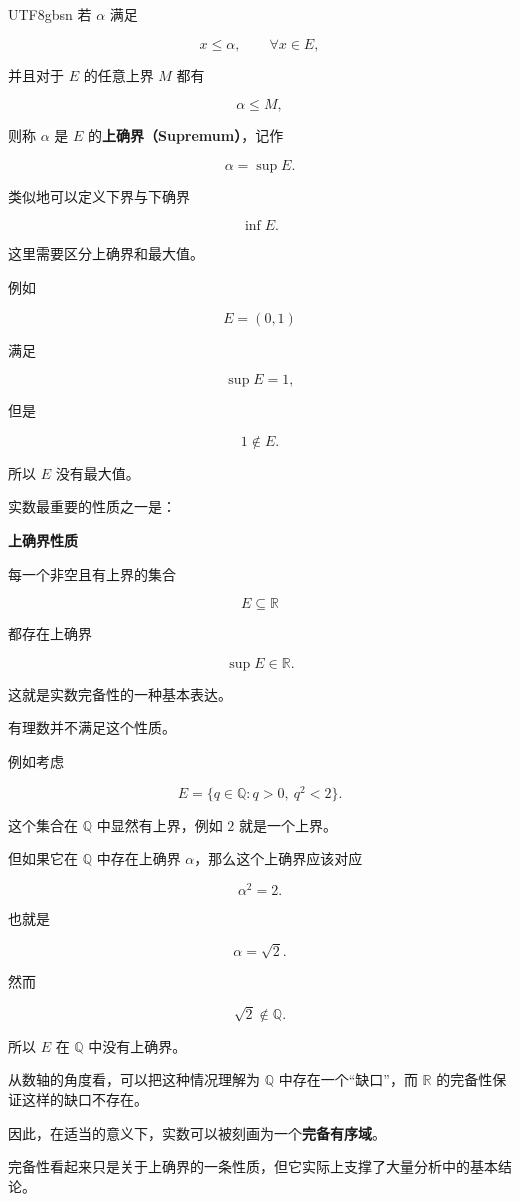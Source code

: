 \documentclass[11pt]{article}
\begin{document}
\begin{CJK*}{UTF8}{gbsn}
若 $\alpha$ 满足

\[
x\leq\alpha,\qquad\forall x\in E,
\]

并且对于 $E$ 的任意上界 $M$ 都有

\[
\alpha\leq M,
\]

则称 $\alpha$ 是 $E$ 的\textbf{上确界（Supremum）}，记作

\[
\alpha=\sup E.
\]

类似地可以定义下界与下确界

\[
\inf E.
\]

这里需要区分上确界和最大值。

例如

\[
E=(0,1)
\]

满足

\[
\sup E=1,
\]

但是

\[
1\notin E.
\]

所以 $E$ 没有最大值。

实数最重要的性质之一是：

\textbf{上确界性质}

每一个非空且有上界的集合

\[
E\subseteq\mathbb{R}
\]

都存在上确界

\[
\sup E\in\mathbb{R}.
\]

这就是实数完备性的一种基本表达。

有理数并不满足这个性质。

例如考虑

\[
E=\{q\in\mathbb{Q}:q>0,\ q^{2}<2\}.
\]

这个集合在 $\mathbb{Q}$ 中显然有上界，例如 $2$ 就是一个上界。

但如果它在 $\mathbb{Q}$ 中存在上确界 $\alpha$，那么这个上确界应该对应

\[
\alpha^{2}=2.
\]

也就是

\[
\alpha=\sqrt{2}.
\]

然而

\[
\sqrt{2}\notin\mathbb{Q}.
\]

所以 $E$ 在 $\mathbb{Q}$ 中没有上确界。

从数轴的角度看，可以把这种情况理解为 $\mathbb{Q}$ 中存在一个“缺口”，而 $\mathbb{R}$ 的完备性保证这样的缺口不存在。

因此，在适当的意义下，实数可以被刻画为一个\textbf{完备有序域}。

完备性看起来只是关于上确界的一条性质，但它实际上支撑了大量分析中的基本结论。


\end{CJK*}
\end{document}
